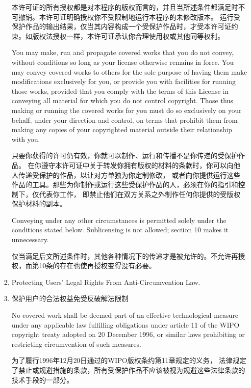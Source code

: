 \documentclass[11pt]{article}
\begin{document}
\begin{enumerate}
        本许可证的所有授权都是对本程序的版权而言的，并且当所述条件都满足时不可撤销。本许可证明确授权你不受限制地运行本程序的未修改版本。
        运行受保护作品的输出结果，仅当其内容构成一个受保护作品时，才受本许可证约束。如版权法授权一样，本许可证承认你合理使用权或其他同等权利。

        You may make, run and propagate covered works that you do not
        convey, without conditions so long as your license otherwise remains
        in force.  You may convey covered works to others for the sole purpose
        of having them make modifications exclusively for you, or provide you
        with facilities for running those works, provided that you comply with
        the terms of this License in conveying all material for which you do
        not control copyright.  Those thus making or running the covered works
        for you must do so exclusively on your behalf, under your direction
        and control, on terms that prohibit them from making any copies of
        your copyrighted material outside their relationship with you.

        只要你获得的许可仍有效，你就可以制作、运行和传播不是你传递的受保护作品。
        在你遵守本许可证中关于转发你拥有版权的材料的条款时，你可以向他人传递受保护的作品，以让对方单独为你定制修改，
        或者向你提供运行这些作品的工具。那些为你制作或运行这些受保护作品的人，必须在你的指引和控制下，仅代表你工作，
        即禁止他们在双方关系之外制作任何你提供的受版权保护材料的副本。

        Conveying under any other circumstances is permitted solely under
        the conditions stated below.  Sublicensing is not allowed; section 10
        makes it unnecessary.

        仅当满足后文所述条件时，其他各种情况下的传递才是被允许的。不允许再授权，而第10条的存在也使再授权变得没有必要。

  \item Protecting Users' Legal Rights From Anti-Circumvention Law.
  \item 保护用户的合法权益免受反破解法限制

        No covered work shall be deemed part of an effective technological
        measure under any applicable law fulfilling obligations under article
        11 of the WIPO copyright treaty adopted on 20 December 1996, or
        similar laws prohibiting or restricting circumvention of such
        measures.

        为了履行1996年12月20日通过的WIPO版权条约第11章规定的义务，
        法律规定了禁止或规避措施的条款，所有受保护作品不应该被视为规避这些法律条款的技术手段的一部分。


\end{enumerate}
\end{document}
